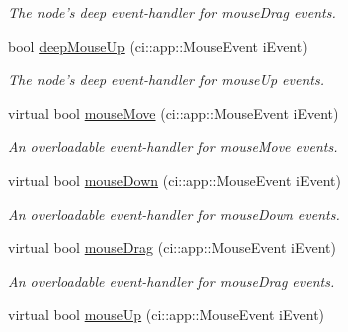 \begin{DoxyCompactItemize}
\begin{DoxyCompactList}\small\item\em The node's deep event-\/handler for mouse\-Drag events. \end{DoxyCompactList}\item 
\hypertarget{class_ui_base_a39080713a4b933f1316c06f3c30cec07}{bool \hyperlink{class_ui_base_a39080713a4b933f1316c06f3c30cec07}{deep\-Mouse\-Up} (ci\-::app\-::\-Mouse\-Event i\-Event)}\label{class_ui_base_a39080713a4b933f1316c06f3c30cec07}

\begin{DoxyCompactList}\small\item\em The node's deep event-\/handler for mouse\-Up events. \end{DoxyCompactList}\item 
\hypertarget{class_ui_base_a83db01e2ef463e4863e644902720123e}{virtual bool \hyperlink{class_ui_base_a83db01e2ef463e4863e644902720123e}{mouse\-Move} (ci\-::app\-::\-Mouse\-Event i\-Event)}\label{class_ui_base_a83db01e2ef463e4863e644902720123e}

\begin{DoxyCompactList}\small\item\em An overloadable event-\/handler for mouse\-Move events. \end{DoxyCompactList}\item 
\hypertarget{class_ui_base_a054e1aa9ccc25882d21205a59fea201d}{virtual bool \hyperlink{class_ui_base_a054e1aa9ccc25882d21205a59fea201d}{mouse\-Down} (ci\-::app\-::\-Mouse\-Event i\-Event)}\label{class_ui_base_a054e1aa9ccc25882d21205a59fea201d}

\begin{DoxyCompactList}\small\item\em An overloadable event-\/handler for mouse\-Down events. \end{DoxyCompactList}\item 
\hypertarget{class_ui_base_af36176bd7a0db525f1a03a58617af5df}{virtual bool \hyperlink{class_ui_base_af36176bd7a0db525f1a03a58617af5df}{mouse\-Drag} (ci\-::app\-::\-Mouse\-Event i\-Event)}\label{class_ui_base_af36176bd7a0db525f1a03a58617af5df}

\begin{DoxyCompactList}\small\item\em An overloadable event-\/handler for mouse\-Drag events. \end{DoxyCompactList}\item 
\hypertarget{class_ui_base_a5f452e72bcb3cdbfcb05eba8e4c71412}{virtual bool \hyperlink{class_ui_base_a5f452e72bcb3cdbfcb05eba8e4c71412}{mouse\-Up} (ci\-::app\-::\-Mouse\-Event i\-Event)}\label{class_ui_base_a5f452e72bcb3cdbfcb05eba8e4c71412}


\end{DoxyCompactItemize}
